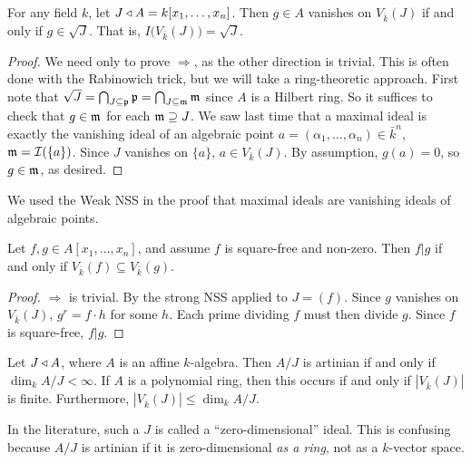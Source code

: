  \setcounter{lecture}{21}

 \begin{theorem}
   For any field $k$, let $J\triangleleft A=k[x_1,\dots, x_n]$. Then $g\in A$ vanishes on $V_{\bar
   k}(J)$ if and only if $g\in \sqrt J$. That is, $I\bigl(V_{\bar k}(J)\bigr)=\sqrt J$.
 \end{theorem}
 \begin{proof}
   We need only to prove $\Rightarrow$, as the other direction is trivial. This is often
   done with the Rabinowich trick, but we will take a ring-theoretic approach. First note
   that $\sqrt J = \bigcap_{J\subseteq \mathfrak{p}} \mathfrak{p} =\bigcap_{J\subseteq \mathfrak{m}}\mathfrak{m}$ since $A$ is a
   Hilbert ring. So it suffices to check that $g\in \mathfrak{m}$ for each $\mathfrak{m}\supseteq J$. We saw
   last time that a maximal ideal is exactly the vanishing ideal of an algebraic
   point $a=(\alpha_1,\dots, \alpha_n)\in \bar k^n$, $\mathfrak{m}=\mathcal{I}(\{a\})$. Since $J$ vanishes on
   $\{a\}$, $a\in V_{\bar k}(J)$. By assumption, $g(a)=0$, so $g\in \mathfrak{m}$, as desired.
 \end{proof}
 \begin{remark}
   We used the Weak NSS in the proof that maximal ideals are vanishing ideals of
   algebraic points.
 \end{remark}
 \begin{corollary}
   Let $f,g\in A[x_1,\dots, x_n]$, and assume $f$ is square-free and non-zero. Then $f|g$
   if and only if $V_{\bar k}(f)\subseteq V_{\bar k}(g)$.
 \end{corollary}
 \begin{proof}
   $\Rightarrow$ is trivial. By the strong NSS applied to $J=(f)$. Since $g$ vanishes on
   $V_{\bar k}(J)$, $g^r=f\cdot h$ for some $h$. Each prime dividing $f$ must then divide
   $g$. Since $f$ is square-free, $f|g$.
 \end{proof}
 \begin{theorem}
   Let $J\triangleleft A$, where $A$ is an affine $k$-algebra. Then $A/J$ is artinian if and only if
   $\dim_k A/J< \infty$. If $A$ is a polynomial ring, then this occurs if and only if
   $|V_{\bar k}(J)|$ is finite. Furthermore, $|V_{\bar k}(J)|\le \dim_k A/J$.
 \end{theorem}
 \begin{warning}
   In the literature, such a $J$ is called a ``zero-dimensional'' ideal. This is confusing
   because $A/J$ is artinian if it is zero-dimensional \emph{as a ring}, not as a
   $k$-vector space.
 \end{warning}
